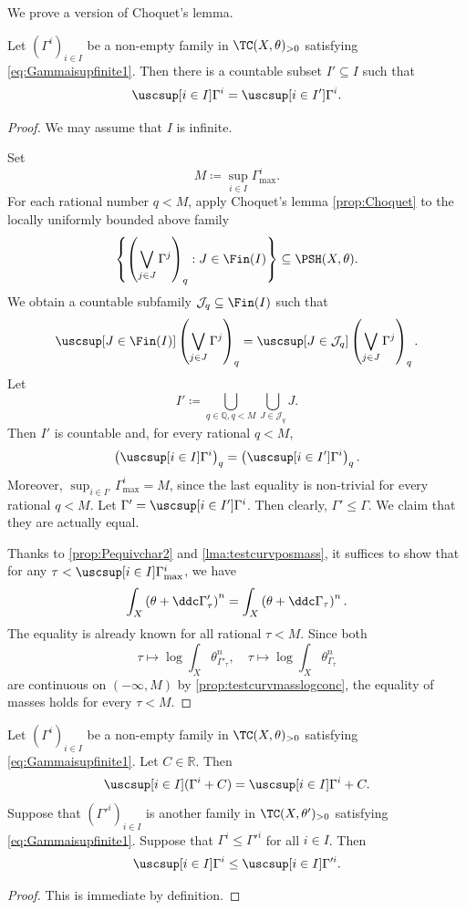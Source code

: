 We prove a version of Choquet's lemma.
\begin{proposition}\label{prop:testcurvChoquet}
    Let $(\Gamma^i)_{i\in I}$ be a non-empty family in $\TC(X,\theta)_{>0}$ satisfying \eqref{eq:Gammaisupfinite1}. Then there is a countable subset $I'\subseteq I$ such that
    \[
    \uscsup[i\in I]\Gamma^i =\uscsup[i\in I']\Gamma^i.
    \]
\end{proposition}
\begin{proof}
    We may assume that $I$ is infinite.

    Set
    \[
        M\coloneqq \sup_{i\in I}\Gamma^i_{\max}.
    \]
    For each rational number $q<M$, apply Choquet's lemma \cref{prop:Choquet} to the locally uniformly bounded above family
    \[
        \left\{\left(\bigvee_{j\in J}\Gamma^j\right)_q:J\in\Fin(I)\right\}\subseteq \PSH(X,\theta).
    \]  
    We obtain a countable subfamily $\mathcal J_q\subseteq \Fin(I)$ such that
    \[
        \uscsup[J\in\Fin(I)]\left(\bigvee_{j\in J}\Gamma^j\right)_q = \uscsup[J\in\mathcal J_q]\left(\bigvee_{j\in J}\Gamma^j\right)_q.
    \]
    Let
    \[
        I'\coloneqq \bigcup_{q\in\mathbb Q, q<M} \bigcup_{J\in\mathcal J_q}J.
    \]
    Then $I'$ is countable and, for every rational $q<M$,
    \[
        \left(\uscsup[i\in I]\Gamma^i\right)_q= \left(\uscsup[i\in I']\Gamma^i\right)_q.
    \]
    Moreover, $\sup_{i\in I'}\Gamma^i_{\max}=M$, since the last equality is non-trivial for every rational $q<M$.
    Let $\Gamma'=\uscsup[i\in I']\Gamma^i$. Then clearly, $\Gamma'\leq \Gamma$. We claim that they are actually equal.

    Thanks to \cref{prop:Pequivchar2} and \cref{lma:testcurvposmass}, it suffices to show that for any $\tau<\uscsup[i\in I]\Gamma^i_{\max}$, we have
    \[
    \int_X \left(\theta+\ddc \Gamma'_{\tau}\right)^n=\int_X \left(\theta+\ddc \Gamma_{\tau}\right)^n.
    \]
    The equality is already known for all rational $\tau<M$. Since both
    \[
    \tau\mapsto \log\int_X\theta_{\Gamma'_\tau}^n,\quad \tau\mapsto \log\int_X\theta_{\Gamma_\tau}^n
    \]
    are continuous on $(-\infty,M)$ by \cref{prop:testcurvmasslogconc}, the equality of masses holds for every $\tau<M$.
\end{proof}

\begin{proposition}\label{prop:supGammiotherprop}
    Let $(\Gamma^i)_{i\in I}$ be a non-empty family in $\TC(X,\theta)_{>0}$ satisfying \eqref{eq:Gammaisupfinite1}. Let $C\in \mathbb{R}$. Then
    \[
    \uscsup[i\in I] (\Gamma^i+C)=\uscsup[i\in I] \Gamma^i+C.
    \]
    Suppose that $(\Gamma'^i)_{i\in I}$ is another family in $\TC(X,\theta')_{>0}$ satisfying \eqref{eq:Gammaisupfinite1}. Suppose that $\Gamma^i\leq \Gamma'^i$ for all $i\in I$. Then
    \[
    \uscsup[i\in I]\Gamma^i\leq \uscsup[i\in I]\Gamma'^i.
    \]
\end{proposition}
\begin{proof}
    This is immediate by definition.
\end{proof}

